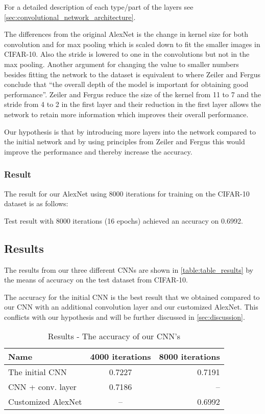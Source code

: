 For a detailed description of each type/part of the layers see
\autoref{sec:convolutional_network_architecture}. 


The differences from the original AlexNet is the change in kernel size for both
convolution and for max pooling which is scaled down to fit the smaller
images in CIFAR-10. Also the stride is lowered to one in the convolutions but
not in the max pooling. Another argument for changing the value to smaller
numbers besides fitting the network to the dataset is equivalent to 
\cite{ZeilerFergus} where Zeiler and Fergus conclude that ``the overall depth of
the model is important for obtaining good performance''. Zeiler and
Fergus\cite{ZeilerFergus} reduce the size of the kernel from 11 to 7 and
the stride from 4 to 2 in the first layer and their reduction in the first layer
allows the network to retain more information which improves their overall
performance. 


Our hypothesis is that by introducing more layers into the network compared to
the initial network and by using principles from Zeiler and
Fergus\cite{ZeilerFergus} this would improve the performance
and thereby increase the accuracy.


\subsubsection{Result}

The result for our AlexNet using 8000 iterations for training on the CIFAR-10
dataset is as follows: 

Test result with 8000 iterations (16 epochs) achieved an accuracy on 0.6992. 


\subsection{Results} %
\label{sub:results}

The results from our three different CNNs are shown in
\autoref{table:table_results} by the means of accuracy on the test dataset from
CIFAR-10. 

The accuracy for the initial CNN is the best result that we obtained
compared to our CNN with an additional convolution layer and our customized
AlexNet. This conflicts with our hypothesis and will be further discussed in
\autoref{sec:discussion}.

\vspace{3 mm} %
\begin{table}[H]
\centering
\sffamily
\small
\begin{tabular}{l | c r}
\toprule
Name 					& 4000 iterations		& 8000 iterations	\\
\midrule 
The initial CNN 		& 0.7227				& 0.7191			\\ 
CNN + conv. layer		& 0.7186				& --				\\ 
Customized AlexNet		& -- 					& 0.6992	 		\\ 
\bottomrule 
\end{tabular}
\caption[Short caption]{Results - The accuracy of our CNN's}
\label{table:table_results}
\end{table}


